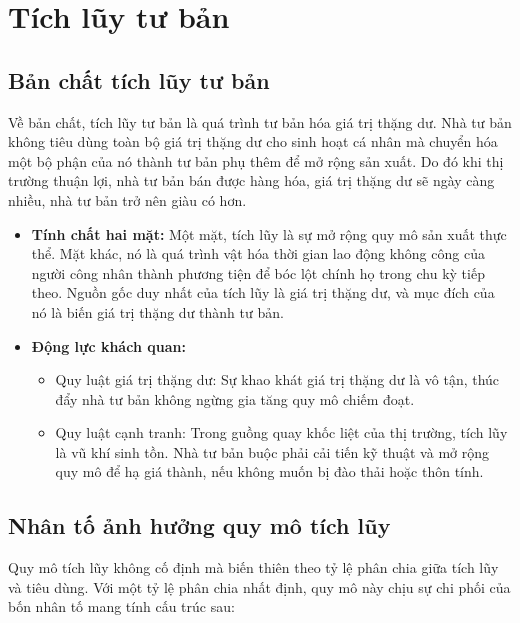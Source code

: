 \section{Tích lũy tư bản}

\subsection{Bản chất tích lũy tư bản}
Về bản chất, tích lũy tư bản là quá trình tư bản hóa giá trị thặng dư. Nhà tư bản không tiêu dùng toàn bộ giá trị thặng dư cho sinh hoạt cá nhân mà chuyển hóa một bộ phận của nó thành tư bản phụ thêm để mở rộng sản xuất. Do đó khi thị trường thuận lợi, nhà tư bản bán được hàng hóa, giá trị thặng dư sẽ ngày càng nhiều, nhà tư bản trở nên giàu có hơn.
\begin{itemize}
    \item \textbf{Tính chất hai mặt:} Một mặt, tích lũy là sự mở rộng quy mô sản xuất thực thể. Mặt khác, nó là quá trình vật hóa thời gian lao động không công của người công nhân thành phương tiện để bóc lột chính họ trong chu kỳ tiếp theo. Nguồn gốc duy nhất của tích lũy là giá trị thặng dư, và mục đích của nó là biến giá trị thặng dư thành tư bản.
    \item \textbf{Động lực khách quan:}
    \begin{itemize}
        \item Quy luật giá trị thặng dư: Sự khao khát giá trị thặng dư là vô tận, thúc đẩy nhà tư bản không ngừng gia tăng quy mô chiếm đoạt.
        \item Quy luật cạnh tranh: Trong guồng quay khốc liệt của thị trường, tích lũy là vũ khí sinh tồn. Nhà tư bản buộc phải cải tiến kỹ thuật và mở rộng quy mô để hạ giá thành, nếu không muốn bị đào thải hoặc thôn tính.
    \end{itemize}
\end{itemize}

\subsection{Nhân tố ảnh hưởng quy mô tích lũy}

Quy mô tích lũy không cố định mà biến thiên theo tỷ lệ phân chia giữa tích lũy và tiêu dùng. Với một tỷ lệ phân chia nhất định, quy mô này chịu sự chi phối của bốn nhân tố mang tính cấu trúc sau:

